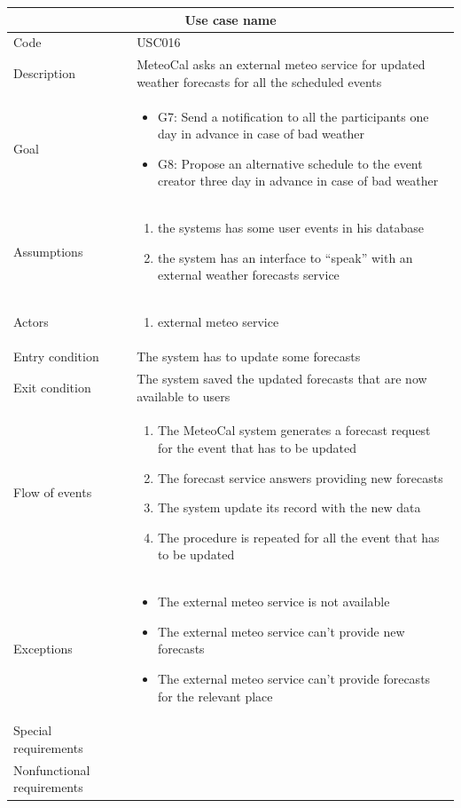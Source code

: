 \documentclass[10pt,a4paper,titlepage]{article}
\begin{document}
\begin{tabular}[h]{| p{3cm} | p{10cm} |} 
\hline \multicolumn{2}{|c|}{\textbf{Use case name}} \\  
\hline Code & USC016\\  
\hline Description & MeteoCal asks an external meteo service for updated weather forecasts for all the scheduled events\\ 
\hline Goal & \begin{itemize}
\item G7: Send a notification to all the participants one day in advance in case of bad weather
\item G8: Propose an alternative schedule to the event creator three day in advance in case of bad weather
\end{itemize}\\
\hline Assumptions  & \begin{enumerate} 
\item the systems has some user events in his database
\item the system has an interface to “speak” with an external weather forecasts service
\end{enumerate} \\ 
\hline Actors &  \begin{enumerate} 
\item external meteo service
\end{enumerate} \\ 
\hline Entry condition & The system has to update some forecasts\\ 
\hline Exit condition & The system saved the updated forecasts that are now available to users\\ 
\hline Flow of events & \begin{enumerate} 
\item The MeteoCal system generates a forecast request for the event that has to be updated
\item The forecast service answers providing new forecasts
\item The system update its record with the new data
\item The procedure is repeated for all the event that has to be updated
\end{enumerate}\\ 
\hline Exceptions & \begin{itemize}
\item  The external meteo service is not available
\item The external meteo service can’t provide new forecasts
\item The external meteo service can’t provide forecasts for the relevant place
\end{itemize}\\ 
\hline Special requirements &\\ 
\hline Nonfunctional requirements &\\ 
\hline 
\end{tabular} 
\end{document}
